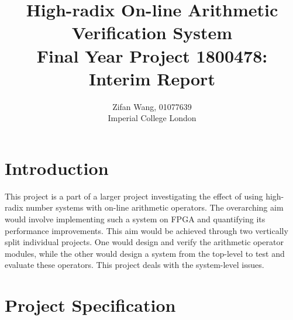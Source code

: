 \documentclass[journal]{IEEEtran}
\begin{document}
\title{%
  High-radix On-line Arithmetic Verification System\\
  \large Final Year Project 1800478: Interim Report}
\author{Zifan Wang, 01077639\\Imperial College London}


\maketitle


\section{Introduction}

This project is a part of a larger project investigating the effect of using
high-radix number systems with on-line arithmetic operators.
The overarching aim would involve implementing such a system on FPGA and
quantifying its performance improvements.
This aim would be achieved through two vertically split individual projects.
One would design and verify the arithmetic operator modules,
while the other would design a system from the top-level to test and
evaluate these operators.
This project deals with the system-level issues.

\section{Project Specification}
\end{document}
